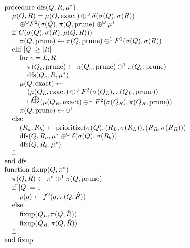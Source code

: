 \documentclass[times, 10pt,twocolumn]{article}
\newcommand{\union}{\cup}
\DeclareMathOperator{\dfs}{dfs}
\DeclareMathOperator{\exact}{exact}
\DeclareMathOperator{\prune}{prune}
\newcommand{\muv}{\union^{\bigoplus}}
\newcommand{\muh}{\oplus^{\union}}
\newcommand{\wholeR}{\hat{R}}
\newcommand{\x}{\hspace{0.15in}}
\newcommand{\xx}{\hspace{0.3in}}
\newcommand{\xxx}{\hspace{0.45in}}
\begin{document}
\begin{equation*}
  \begin{array}{l}
    \mbox{procedure dfs}(Q, R, \mu^{*})
    \\
    \x \mu(Q, R) = \mu(Q, \exact) \muh \delta(\sigma(Q), \sigma(R))
    \\ \xx \muh F^{2}(\sigma(Q), \pi(Q, \prune) \muh \mu^{*}
    \\
    \x \mbox{if } C(\sigma(Q), \sigma(R), \mu(Q, R)))
    \\
    \xx \pi(Q, \prune) \gets \pi(Q, \prune) \oplus^{1} F^{1}(\sigma(Q), \sigma(R))
    \\
    \x \mbox{elif } |Q| \geq |R|
    \\
    \xx \mbox{for } c = L, R
    \\
    \xxx \pi(Q_c, \prune) \gets \pi(Q_c, \prune) \oplus^{1} \pi(Q_c, \prune)
    \\
    \xxx \mbox{dfs}(Q_c, R, \mu^{*})
    \\
    \xx \mu(Q, \exact) \gets
    \\
    \xxx (\mu(Q_L, \exact) \muh F^{2}(\sigma(Q_L), \pi(Q_L, \prune))
    \\
    \xxx \muv (\mu(Q_R, \exact) \muh F^{2}(\sigma(Q_R), \pi(Q_R, \prune))
    \\
    \xx \pi(Q, \prune) \gets 0^{1}
    \\
    \x \mbox{else}
    \\
    \xx (R_a, R_b) \gets \mbox{prioritize}(\sigma(Q), (R_L, \sigma(R_L)), (R_R, \sigma(R_R)))
    \\
    \xx \dfs(Q, R_a, \mu^{*} \muh \delta(\sigma(Q), \sigma(R_b))
    \\
    \xx \dfs(Q, R_b, \mu^{*})
    \\
    \x \mbox{fi}
    \\
    \mbox{end dfs}
    \\
    \mbox{function fixup}(Q, \pi^{*})
    \\
    \x \pi(Q, \wholeR) \gets \pi^{*} \oplus^{1} \pi(Q, \prune)
    \\
    \x \mbox{if } |Q| = 1
    \\
    \xx \rho(q) \gets f^{2}(q, \pi(Q, \wholeR))
    \\
    \x \mbox{else}
    \\
    \xx \mbox{fixup}(Q_L, \pi(Q, \wholeR))
    \\
    \xx \mbox{fixup}(Q_R, \pi(Q, \wholeR))
    \\
    \x \mbox{fi}
    \\
    \mbox{end fixup}
  \end{array}
\end{equation*}
\end{document}
